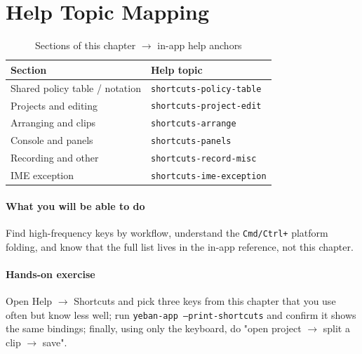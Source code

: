 \section{Help Topic Mapping}

\begin{table}[htbp]
\centering
\caption{Sections of this chapter $\to$ in-app help anchors}
\label{tab:ch09-help}
\begin{tabular}{ll}
\hline
Section & Help topic \\
\hline
Shared policy table / notation & \texttt{shortcuts-policy-table} \\
Projects and editing & \texttt{shortcuts-project-edit} \\
Arranging and clips & \texttt{shortcuts-arrange} \\
Console and panels & \texttt{shortcuts-panels} \\
Recording and other & \texttt{shortcuts-record-misc} \\
IME exception & \texttt{shortcuts-ime-exception} \\
\hline
\end{tabular}
\end{table}

\paragraph{What you will be able to do} Find high-frequency keys by workflow, understand the \texttt{Cmd/Ctrl+} platform folding, and know that the full list lives in the in-app reference, not this chapter.

\paragraph{Hands-on exercise} Open Help $\to$ Shortcuts and pick three keys from this chapter that you use often but know less well; run \texttt{yeban-app --print-shortcuts} and confirm it shows the same bindings; finally, using only the keyboard, do "open project $\to$ split a clip $\to$ save".
